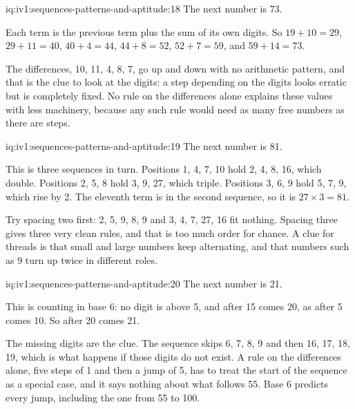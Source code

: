 \begin{solution}{iq:iv1:sequences-patterns-and-aptitude:18}
The next number is 73.

Each term is the previous term plus the sum of its own digits. So $19 + 10 = 29$, $29 + 11 = 40$, $40 + 4 = 44$, $44 + 8 = 52$, $52 + 7 = 59$, and $59 + 14 = 73$.

The differences, 10, 11, 4, 8, 7, go up and down with no arithmetic pattern, and that is the clue to look at the digits: a step depending on the digits looks erratic but is completely fixed. No rule on the differences alone explains these values with less machinery, because any such rule would need as many free numbers as there are steps.

\end{solution}

\begin{solution}{iq:iv1:sequences-patterns-and-aptitude:19}
The next number is 81.

This is three sequences in turn. Positions 1, 4, 7, 10 hold 2, 4, 8, 16, which double. Positions 2, 5, 8 hold 3, 9, 27, which triple. Positions 3, 6, 9 hold 5, 7, 9, which rise by 2. The eleventh term is in the second sequence, so it is $27 \times 3 = 81$.

Try spacing two first: 2, 5, 9, 8, 9 and 3, 4, 7, 27, 16 fit nothing. Spacing three gives three very clean rules, and that is too much order for chance. A clue for threads is that small and large numbers keep alternating, and that numbers such as 9 turn up twice in different roles.

\end{solution}

\begin{solution}{iq:iv1:sequences-patterns-and-aptitude:20}
The next number is 21.

This is counting in base 6: no digit is above 5, and after 15 comes 20, as after 5 comes 10. So after 20 comes 21.

The missing digits are the clue. The sequence skips 6, 7, 8, 9 and then 16, 17, 18, 19, which is what happens if those digits do not exist. A rule on the differences alone, five steps of 1 and then a jump of 5, has to treat the start of the sequence as a special case, and it says nothing about what follows 55. Base 6 predicts every jump, including the one from 55 to 100.

\end{solution}

